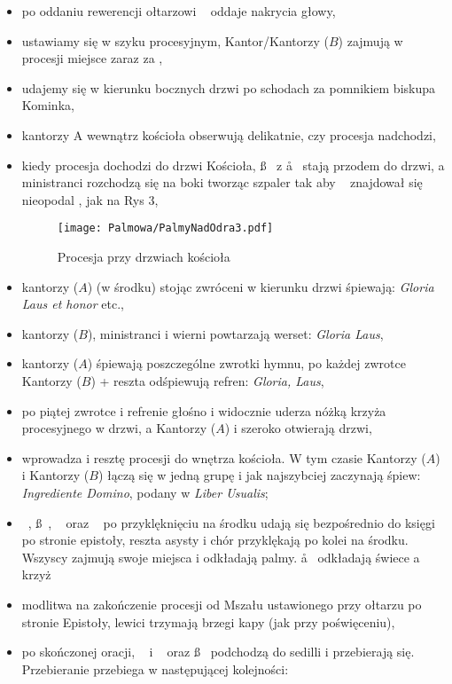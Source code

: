 \begin{itemize}
			\item po oddaniu rewerencji ołtarzowi \cc~ oddaje nakrycia głowy,
			\item ustawiamy się w szyku procesyjnym, Kantor/Kantorzy ($B$) zajmują w procesji miejsce zaraz za ,
			\item udajemy się w kierunku bocznych drzwi po schodach za pomnikiem biskupa Kominka,
			\item kantorzy A wewnątrz kościoła obserwują delikatnie, czy procesja nadchodzi,
			\item kiedy procesja dochodzi do drzwi Kościoła, \ss~ z \aa~ stają przodem do drzwi, a ministranci rozchodzą się na boki tworząc szpaler tak aby \ii~ znajdował się nieopodal , jak na Rys 3,
			
			\bigskip
			
			\begin{figure}[h]
				\centering
				\texttt{[image: Palmowa/PalmyNadOdra3.pdf]}
				\caption{Procesja przy drzwiach kościoła}
			\end{figure}
			
			\item kantorzy ($A$) (w środku) stojąc zwróceni w kierunku drzwi śpiewają: \textit{Gloria Laus et honor} etc.,
			\item kantorzy ($B$), ministranci i wierni powtarzają werset: \textit{Gloria Laus},
			\item kantorzy ($A$) śpiewają poszczególne zwrotki hymnu, po każdej zwrotce Kantorzy ($B$) + reszta odśpiewują refren: \textit{Gloria, Laus},
			\item po piątej zwrotce i refrenie  głośno i widocznie uderza nóżką krzyża procesyjnego w drzwi, a Kantorzy ($A$) i  szeroko otwierają drzwi,
			\item {} wprowadza  i resztę procesji do wnętrza kościoła. W tym czasie Kantorzy ($A$) i Kantorzy ($B$) łączą się w jedną grupę i jak najszybciej zaczynają śpiew: \textit{Ingrediente Domino}, podany w \textit{Liber Usualis};
			\item \dd~, \ss~, \ii~ oraz \cc~ po przyklęknięciu na środku udają się bezpośrednio do księgi po stronie epistoły, reszta asysty i chór przyklękają po kolei na środku. Wszyscy zajmują swoje miejsca i odkładają palmy. \aa~ odkładają świece a  krzyż 
			\item modlitwa na zakończenie procesji od Mszału ustawionego przy ołtarzu po stronie Epistoły, lewici trzymają brzegi kapy (jak przy poświęceniu),
			\item po skończonej oracji, \ii~ i \dd~ oraz \ss~ podchodzą do sedilli i przebierają się. Przebieranie przebiega w następującej kolejności:
			

\end{itemize}
